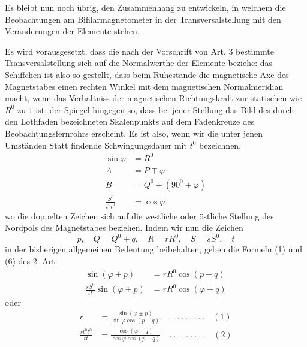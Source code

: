 Es bleibt nun noch übrig, den Zusammenhang zu entwickeln, in welchem die Beobachtungen am Bifilarmagnetometer in der Transversalstellung mit den Veränderungen der Elemente stehen.

Es wird vorausgesetzt, dass die nach der Vorschrift von Art. 3 bestimmte Transversalstellung sich auf die Normalwerthe der Elemente beziehe: das Schiffchen ist also so gestellt, dass beim Ruhestande die magnetische Axe des Magnetstabes einen rechten Winkel mit dem magnetischen Normalmeridian macht, wenn das Verhältniss der magnetischen Richtungskraft zur statischen wie $R^0$ zu $1$ ist; der Spiegel hingegen so, dass bei jener Stellung das Bild des durch den Lothfaden bezeichneten Skalenpunkts auf dem Fadenkreuze des Beobachtungsfernrohrs erscheint. Es ist also, wenn wir die unter jenen Umständen Statt findende Schwingungsdauer mit $t^0$ bezeichnen,
\[
\begin{aligned}
\sin\varphi&=R^0\\
A&=P\mp\varphi\\
B&=Q^0\mp(90^0+\varphi)\\
\frac{S^0}{t^0t^0}&=\cos\varphi
\end{aligned}
\]
wo die doppelten Zeichen sich auf die westliche oder östliche Stellung des Nordpols des Magnetstabes beziehen. Indem wir nun die Zeichen
\[
p,\quad Q=Q^0+q,\quad R=rR^0,\quad S=sS^0,\quad t
\]
in der bisherigen allgemeinen Bedeutung beibehalten, geben die Formeln (1) und (6) des 2. Art.
\[
\begin{aligned}
\sin(\varphi\pm p)&=rR^0\cos(p-q)\\
\frac{sS^0}{tt}\sin(\varphi\pm p)&=rR^0\cos(\varphi\pm q)
\end{aligned}
\]
oder
\[
\begin{aligned}
r&=\frac{\sin(\varphi\pm p)}{\sin\varphi\cos(p-q)}\quad .\ .\ .\ .\ .\ .\ .\ .\ .\quad(1)\\
\frac{st^0t^0}{tt}&=\frac{\cos(\varphi\pm q)}{\cos\varphi\cos(p-q)}\quad .\ .\ .\ .\ .\ .\ .\ .\ .\quad(2)
\end{aligned}
\]

